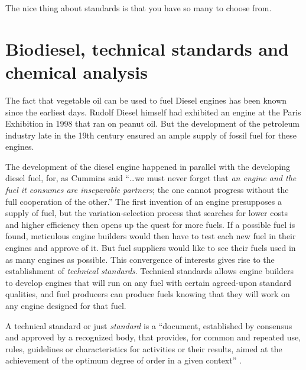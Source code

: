 
\begin{savequote}[60mm]
The nice thing about standards is that you have so many to choose from.
\end{savequote}


\chapter[Biodiesel standards]{Biodiesel, technical standards and chemical analysis} %

\label{Chapter3} %

The fact that vegetable oil can be used to fuel Diesel engines has been known
since the earliest days. Rudolf Diesel himself had exhibited an engine at the
Paris Exhibition in 1998  that ran on peanut
oil. But the development of the petroleum industry late in the 19th century
ensured an ample supply of fossil fuel for these engines.

The development of the diesel engine happened in parallel with the developing
diesel fuel, for, as Cummins said ``\ldots we must never forget that \textit{an
engine and the fuel it consumes are inseparable partners}; the one cannot
progress without the full cooperation of the other.'' \autocite{Cummins1989} The
first invention of an engine presupposes a supply of fuel, but the
variation-selection process that searches for lower costs and higher efficiency
then opens up the quest for more fuels. If a possible fuel is found, meticulous
engine builders would then have to test each new fuel in their engines and
approve of it. But fuel suppliers would like to see their fuels used in as many
engines as possible. This convergence of interests gives rise to the
establishment of \textit{technical standards}. Technical standards allows engine
builders to develop engines that will run on any fuel with certain agreed-upon
standard qualities, and fuel producers can produce fuels knowing that they will
work on any engine designed for that fuel. 

A technical standard or just \textit{standard} is a ``document, established by
consensus and approved by a recognized body, that provides, for common and
repeated use, rules, guidelines or characteristics for activities or their
results, aimed at the achievement of the optimum degree of order in a given
context'' \autocite{Hatto2010}. 

